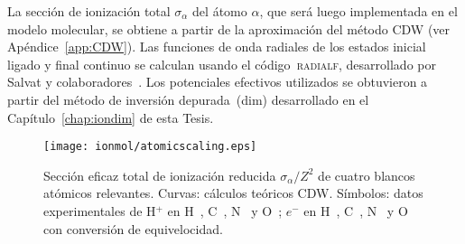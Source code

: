 La sección de ionización total $\sigma_{\alpha}$ del átomo $\alpha$, que 
será luego implementada en el modelo molecular, se obtiene a partir de 
la aproximación del método CDW (ver Apéndice~\ref{app:CDW}). Las 
funciones de onda radiales de los estados inicial ligado y final 
continuo se calculan usando el código~\textsc{radialf}, desarrollado por 
Salvat y colaboradores~\cite{salvat1995}. Los potenciales efectivos
utilizados se obtuvieron a partir del método de inversión 
depurada~(\acs{dim}) desarrollado en el Capítulo~\ref{chap:iondim} de 
esta Tesis. 

\begin{figure}
\centering
\texttt{[image: ionmol/atomicscaling.eps]}
\caption[Sección eficaz total de ionización atómica CDW reducida.]
{Sección eficaz total de ionización reducida $\sigma_{\alpha}/Z^2$ 
de cuatro blancos atómicos relevantes. Curvas: cálculos teóricos CDW. 
Símbolos: datos experimentales de H$^+$ en H~\cite{Shah:81}, 
C~\cite{Toburen:72}, N~\cite{Rudd:85} y O~\cite{Rudd:85}; $e^-$ en 
H~\cite{Shah:87}, C~\cite{Brook:78}, N~\cite{Brook:78} y 
O~\cite{Thompson:95} con conversión de equivelocidad.}
\label{fig:atomscaling}
\end{figure} 



